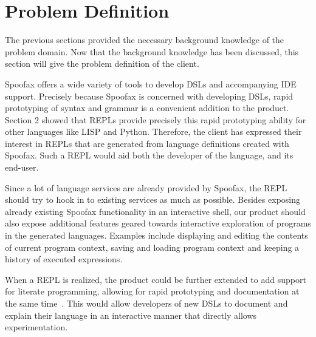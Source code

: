 \section{Problem Definition}
\label{sec:problem-definition}

The previous sections provided the necessary background knowledge of the problem
domain. Now that the background knowledge has been discussed,
this section will give the problem definition of the client.

Spoofax offers a wide variety of tools to develop DSLs and accompanying IDE support.
Precisely because Spoofax is concerned with developing DSLs, rapid prototyping
of syntax and grammar is a convenient addition to the product.
Section 2 showed that REPLs provide precisely this rapid prototyping ability
for other languages like LISP and Python. Therefore, the client has expressed
their interest in REPLs that are generated from language definitions created with
Spoofax. Such a REPL would aid both the developer of the language, and its
end-user.

Since a lot of language services are already provided by Spoofax,
the REPL should try to hook in to existing services as much as possible.
Besides exposing already existing Spoofax functionality in an interactive shell,
our product should also expose additional features geared towards interactive
exploration of programs in the generated languages.
Examples include displaying and editing the contents of current program context,
saving and loading program context and keeping a history of executed expressions.

When a REPL is realized, the product could be further extended to add support
for literate programming, allowing for rapid prototyping and documentation at
the same time~\cite{org-mode}. This would allow developers of new DSLs to
document and explain their language in an interactive manner that directly
allows experimentation.

